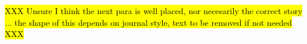 \documentclass[conference]{IEEEtran}
\begin{document}











\hl{XXX Unsure I think the next para is well placed, nor necesarily the correct story ... the shape of this depends on journal style, text to be removed if not needed XXX}
\end{document}
